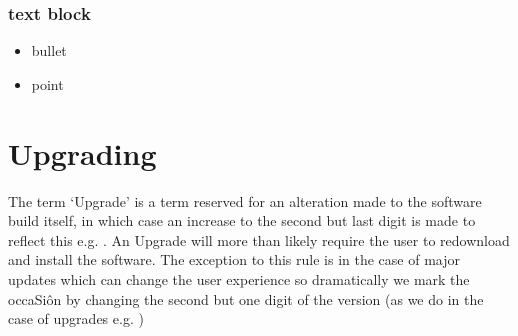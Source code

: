 \documentclass[letterpaper,10pt,openany,oneside,english]{sphinxmanual}
\begin{document}
\subsection{text block}
\label{\detokenize{integration:text-block}}
\begin{sphinxVerbatim}[commandchars=\\\{\}]
  
    
     
      

       
   
      
   

  

 
\end{sphinxVerbatim}

\sphinxAtStartPar
{}
\begin{itemize}
\item {} 
\sphinxAtStartPar
bullet

\item {} 
\sphinxAtStartPar
point

\end{itemize}


\chapter{Upgrading}
\label{\detokenize{upgrading:upgrading}}\label{\detokenize{upgrading::doc}}
\sphinxAtStartPar
The term ‘Upgrade’ is a term reserved for an alteration made to the software build itself, in which case an increase to the second but last digit is made to reflect this e.g. .  An Upgrade will more than likely require the user to re\sphinxhyphen{}download and install the software. The exception to this rule is in the case of major updates which can change the user experience so dramatically we mark the occaSiôn by changing the second but one digit of the version (as we do in the case of upgrades e.g. )
\end{document}
